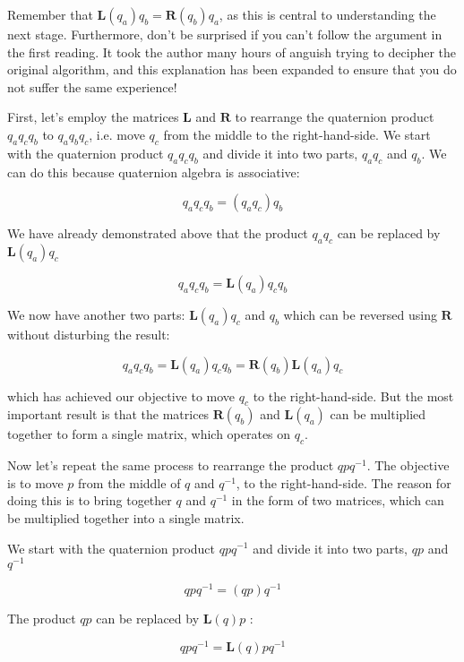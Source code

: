 Remember that $\mathbf{L}\left(q_{a}\right) q_{b}=\mathbf{R}\left(q_{b}\right) q_{a}$, as this is central to understanding the next stage. Furthermore, don't be surprised if you can't follow the argument in the first reading. It took the author many hours of anguish trying to decipher the original algorithm, and this explanation has been expanded to ensure that you do not suffer the same experience!

First, let's employ the matrices $\mathbf{L}$ and $\mathbf{R}$ to rearrange the quaternion product $q_{a} q_{c} q_{b}$ to $q_{a} q_{b} q_{c}$, i.e. move $q_{c}$ from the middle to the right-hand-side. We start with the quaternion product $q_{a} q_{c} q_{b}$ and divide it into two parts, $q_{a} q_{c}$ and $q_{b}$. We can do this because quaternion algebra is associative:

$$
q_{a} q_{c} q_{b}=\left(q_{a} q_{c}\right) q_{b}
$$

We have already demonstrated above that the product $q_{a} q_{c}$ can be replaced by $\mathbf{L}\left(q_{a}\right) q_{c}$

$$
q_{a} q_{c} q_{b}=\mathbf{L}\left(q_{a}\right) q_{c} q_{b}
$$

We now have another two parts: $\mathbf{L}\left(q_{a}\right) q_{c}$ and $q_{b}$ which can be reversed using $\mathbf{R}$ without disturbing the result:

$$
q_{a} q_{c} q_{b}=\mathbf{L}\left(q_{a}\right) q_{c} q_{b}=\mathbf{R}\left(q_{b}\right) \mathbf{L}\left(q_{a}\right) q_{c}
$$

which has achieved our objective to move $q_{c}$ to the right-hand-side. But the most important result is that the matrices $\mathbf{R}\left(q_{b}\right)$ and $\mathbf{L}\left(q_{a}\right)$ can be multiplied together to form a single matrix, which operates on $q_{c}$.

Now let's repeat the same process to rearrange the product $q p q^{-1}$. The objective is to move $p$ from the middle of $q$ and $q^{-1}$, to the right-hand-side. The reason for doing this is to bring together $q$ and $q^{-1}$ in the form of two matrices, which can be multiplied together into a single matrix.

We start with the quaternion product $q p q^{-1}$ and divide it into two parts, $q p$ and $q^{-1}$

$$
q p q^{-1}=(q p) q^{-1}
$$

The product $q p$ can be replaced by $\mathbf{L}(q) p$ :

$$
q p q^{-1}=\mathbf{L}(q) p q^{-1}
$$


